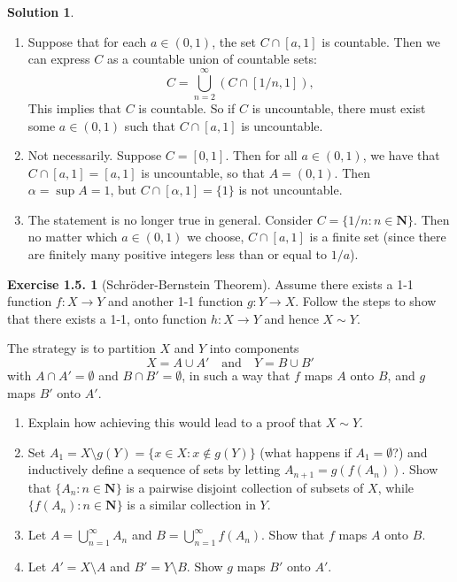 \documentclass[12pt]{article}
\theoremstyle{definition}
\theoremstyle{exercise}
\newtheorem{exercise}{Exercise 1.5.}
\theoremstyle{solution}
\newtheorem*{solution}{Solution}
\newcommand{\N}{\mathbf{N}}
\begin{document}
\begin{solution}
    \begin{enumerate}
        \item Suppose that for each \( a \in (0, 1) \), the set \( C \cap [a, 1] \) is countable. Then we can express \( C \) as a countable union of countable sets:
        \[
            C = \bigcup_{n=2}^{\infty} (C \cap [1/n, 1]),
        \]
        This implies that \( C \) is countable. So if \( C \) is uncountable, there must exist some \( a \in (0, 1) \) such that \( C \cap [a, 1] \) is uncountable. 

        \item Not necessarily. Suppose \( C = [0, 1] \). Then for all \( a \in (0, 1) \), we have that \( C \cap [a, 1] = [a, 1] \) is uncountable, so that \( A = (0, 1) \). Then \( \alpha = \sup A = 1 \), but \( C \cap [\alpha, 1] = \{ 1 \} \) is not uncountable.

        \item The statement is no longer true in general. Consider \( C = \{ 1/n : n \in \N \} \). Then no matter which \( a \in (0, 1) \) we choose, \( C \cap [a, 1] \) is a finite set (since there are finitely many positive integers less than or equal to \( 1/a \)).
    \end{enumerate}
\end{solution}

\begin{exercise}[Schröder-Bernstein Theorem]
\label{ex:11}
    Assume there exists a 1-1 function \( f : X \to Y \) and another 1-1 function \( g : Y \to X \). Follow the steps to show that there exists a 1-1, onto function \( h : X \to Y \) and hence \( X \sim Y \).

    The strategy is to partition \( X \) and \( Y \) into components
    \[
        X = A \cup A' \quad \text{and} \quad Y = B \cup B'
    \]
    with \( A \cap A' = \emptyset \) and \( B \cap B' = \emptyset \), in such a way that \( f \) maps \( A \) onto \( B \), and \( g \) maps \( B' \) onto \( A' \).
    \begin{enumerate}
        \item Explain how achieving this would lead to a proof that \( X \sim Y \).

        \item Set \( A_1 = X \setminus g(Y) = \{ x \in X : x \not\in g(Y) \} \) (what happens if \( A_1 = \emptyset \)?) and inductively define a sequence of sets by letting \( A_{n+1} = g(f(A_n)) \). Show that \( \{ A_n : n \in \N \} \) is a pairwise disjoint collection of subsets of \( X \), while \( \{ f(A_n) : n \in \N \} \) is a similar collection in \( Y \).

        \item Let \( A = \bigcup_{n=1}^{\infty} A_n \) and \( B = \bigcup_{n=1}^{\infty} f(A_n) \). Show that \( f \) maps \( A \) onto \( B \).

        \item Let \( A' = X \setminus A \) and \( B' = Y \setminus B \). Show \( g \) maps \( B' \) onto \( A' \).
    \end{enumerate}
\end{exercise}
\end{document}
